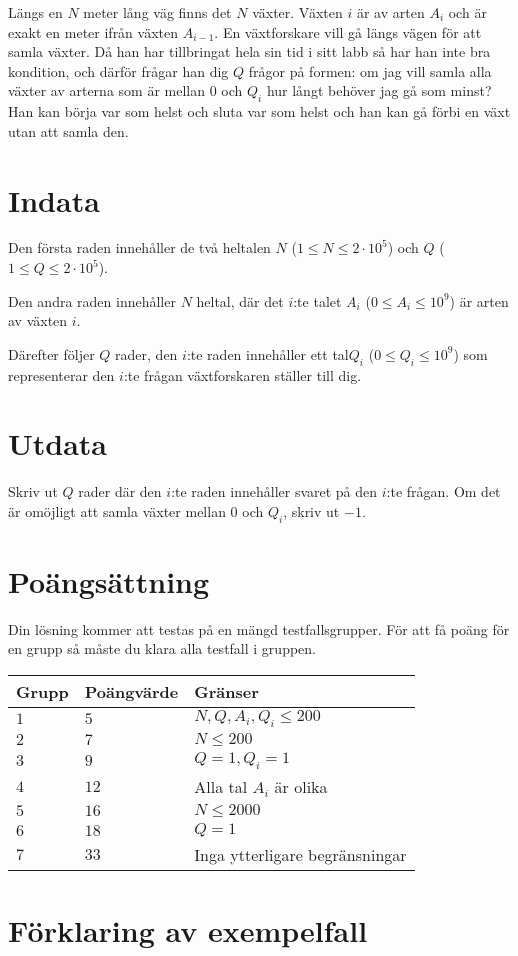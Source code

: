 Längs en $N$ meter lång väg finns det $N$ växter. Växten $i$ är av arten $A_i$ och är exakt en meter ifrån växten $A_{i-1}$. En växtforskare vill gå längs vägen för att samla växter. Då han har tillbringat hela sin tid i sitt labb så har han inte bra kondition,
och därför frågar han dig $Q$ frågor på formen: om jag vill samla alla växter av arterna som är mellan $0$ och $Q_i$ hur långt behöver jag gå som minst?
Han kan börja var som helst och sluta var som helst och han kan gå förbi en växt utan att samla den.
\section*{Indata}
Den första raden innehåller de två heltalen $N$ ($1\leq N \leq 2 \cdot 10^5$) och $Q$ ($1 \leq Q \leq 2 \cdot 10^5$).

Den andra raden innehåller $N$ heltal, där det $i$:te talet $A_i$ ($0\le A_i \le 10^9$) är arten av växten $i$.

Därefter följer $Q$ rader, den $i$:te raden innehåller ett tal$Q_i$ ($0 \leq Q_i \leq 10^9$) som representerar den $i$:te frågan växtforskaren ställer till dig.

\section*{Utdata}
Skriv ut $Q$ rader där den $i$:te raden innehåller svaret på den $i$:te frågan. Om det är omöjligt att samla växter mellan $0$ och $Q_i$, skriv ut $-1$.

\section*{Poängsättning}
Din lösning kommer att testas på en mängd testfallsgrupper.
För att få poäng för en grupp så måste du klara alla testfall i gruppen.

\noindent
\begin{tabular}{| l | l | p{12cm} |}
  \hline
  Grupp & Poängvärde & Gränser \\ \hline
  $1$   & $5$       & $N, Q, A_i, Q_i \leq 200 $\\ \hline
  $2$   & $7$       & $N \leq 200 $\\ \hline
  $3$   & $9$       & $Q=1, Q_i=1$\\ \hline
  $4$   & $12$       & Alla tal $A_i$ är olika \\ \hline
  $5$   & $16$       & $N \leq 2000 $  \\ \hline
  $6$   & $18$       & $Q = 1$ \\ \hline
  $7$   & $33$       & Inga ytterligare begränsningar \\ \hline
\end{tabular}

\section*{Förklaring av exempelfall}

